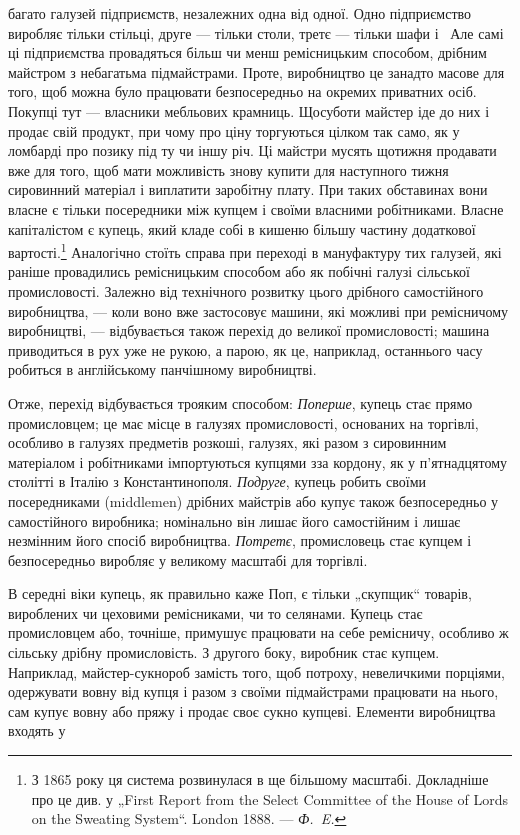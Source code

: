\parcont{}  %
багато галузей підприємств, незалежних одна від одної. Одно
підприємство виробляє тільки стільці, друге — тільки столи,
третє — тільки шафи і~ Але самі ці підприємства провадяться
більш чи менш ремісницьким способом, дрібним майстром з небагатьма
підмайстрами. Проте, виробництво це занадто масове для
того, щоб можна було працювати безпосередньо на окремих
приватних осіб. Покупці тут — власники мебльових крамниць.
Щосуботи майстер іде до них і продає свій продукт, при чому
про ціну торгуються цілком так само, як у ломбарді про позику
під ту чи іншу річ. Ці майстри мусять щотижня продавати вже
для того, щоб мати можливість знову купити для наступного
тижня сировинний матеріал і виплатити заробітну плату. При
таких обставинах вони власне є тільки посередники між купцем
і своїми власними робітниками. Власне капіталістом є купець,
який кладе собі в кишеню більшу частину додаткової вартості.\footnote{
З 1865 року ця система розвинулася в ще більшому масштабі. Докладніше
про це див. у „First Report from the Select Committee of the House of Lords on
the Sweating System“. London 1888. — \emph{Ф.~E.}
}
Аналогічно стоїть справа при переході в мануфактуру тих галузей,
які раніше провадились ремісницьким способом або як
побічні галузі сільської промисловості. Залежно від технічного
розвитку цього дрібного самостійного виробництва, — коли воно
вже застосовує машини, які можливі при ремісничому виробництві,
— відбувається також перехід до великої промисловості;
машина приводиться в рух уже не рукою, а парою, як це, наприклад,
останнього часу робиться в англійському панчішному
виробництві.

Отже, перехід відбувається трояким способом: \emph{Поперше},
купець стає прямо промисловцем; це має місце в галузях промисловості,
основаних на торгівлі, особливо в галузях предметів
розкоші, галузях, які разом з сировинним матеріалом і робітниками
імпортуються купцями зза кордону, як у п’ятнадцятому
столітті в Італію з Константинополя. \emph{Подруге}, купець робить
своїми посередниками (middlemen) дрібних майстрів або купує
також безпосередньо у самостійного виробника; номінально
він лишає його самостійним і лишає незмінним його спосіб виробництва.
\emph{Потретє}, промисловець стає купцем і безпосередньо
виробляє у великому масштабі для торгівлі.

В середні віки купець, як правильно каже Поп, є тільки
„скупщик“ товарів, вироблених чи цеховими ремісниками, чи то
селянами. Купець стає промисловцем або, точніше, примушує
працювати на себе ремісничу, особливо ж сільську дрібну промисловість.
З другого боку, виробник стає купцем. Наприклад,
майстер-сукнороб замість того, щоб потроху, невеличкими
порціями, одержувати вовну від купця і разом з своїми підмайстрами
працювати на нього, сам купує вовну або пряжу і
продає своє сукно купцеві. Елементи виробництва входять у
\parbreak{}  %

